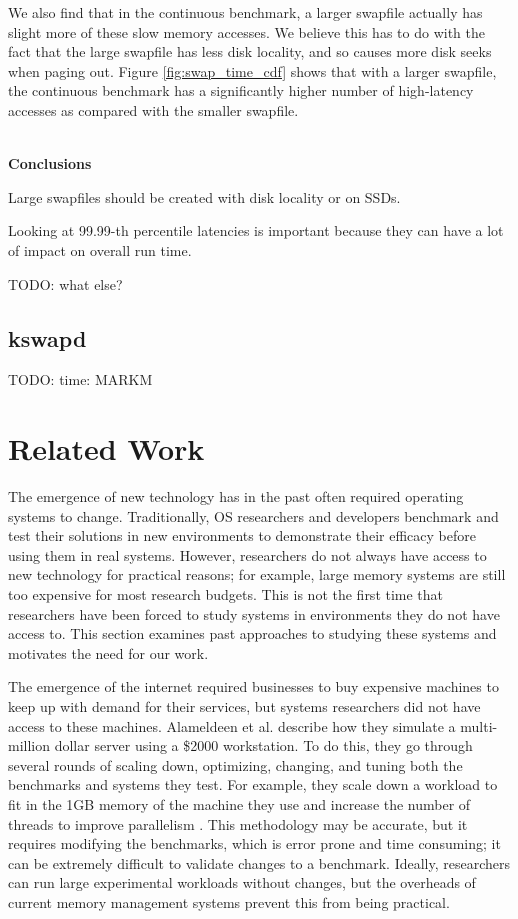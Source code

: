 \documentclass[twocolumn,11pt]{article}
\begin{document}
We also find that in the continuous benchmark, a larger swapfile actually has
slight more of these slow memory accesses. We believe this has to do with the
fact that the large swapfile has less disk locality, and so causes more disk
seeks when paging out. Figure \ref{fig:swap_time_cdf} shows that with a larger
swapfile, the continuous benchmark has a significantly higher number of
high-latency accesses as compared with the smaller swapfile.

~\\ \textbf{Conclusions} 

Large swapfiles should be created with disk locality or on SSDs.

Looking at 99.99-th percentile latencies is important because they can have a
lot of impact on overall run time.

TODO: what else?

\subsection{kswapd}

TODO: time: MARKM


\section{Related Work}

The emergence of new technology has in the past often required operating systems
to change. Traditionally, OS researchers and developers benchmark and test their
solutions in new environments to demonstrate their efficacy before using them in
real systems. However, researchers do not always have access to new technology
for practical reasons; for example, large memory systems are still too expensive
for most research budgets. This is not the first time that researchers have been
forced to study systems in environments they do not have access to. This section
examines past approaches to studying these systems and motivates the need for
our work.

The emergence of the internet required businesses to buy expensive machines to
keep up with demand for their services, but systems researchers did not have
access to these machines. Alameldeen et al. describe how they simulate a
multi-million dollar server using a \$2000 workstation. To do this, they go
through several rounds of scaling down, optimizing, changing, and tuning both
the benchmarks and systems they test. For example, they scale down a workload to
fit in the 1GB memory of the machine they use and increase the number of threads
to improve parallelism \cite{2kmachine}. This methodology may be accurate, but
it requires modifying the benchmarks, which is error prone and time consuming;
it can be extremely difficult to validate changes to a benchmark. Ideally,
researchers can run large experimental workloads without changes, but the overheads
of current memory management systems prevent this from being practical.
\end{document}
